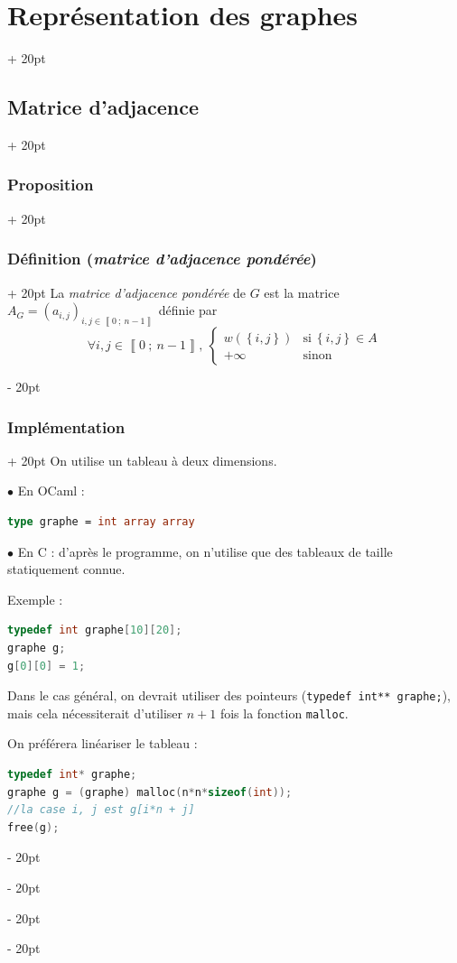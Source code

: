 \documentclass[a4paper, 12pt, twoside]{article}
\newcommand{\nset}[2]{\left\llbracket #1\ ;\ #2 \right\rrbracket}
\newcommand{\set}[1]{\left\{ #1 \right\}}
\newcommand{\ind}[1][20pt]{\advance\leftskip + #1}
\newcommand{\deind}[1][20pt]{\advance\leftskip - #1}
\newenvironment{indt}[2][20pt]{#2 \par \ind[#1]}{\par \deind} %
\begin{document}
\begin{indt}{\section{Représentation des graphes}}
\begin{indt}{\subsection{Matrice d'adjacence}}
\begin{indt}{\subsubsection{Proposition}}
\begin{indt}{\subsubsection{Définition (\textit{matrice d'adjacence pondérée})}}
                    La \textit{matrice d'adjacence pondérée} de $G$ est la matrice
                    $A_G = (a_{i,j})_{i,j \in \nset{0}{n - 1}}$ définie par
                    \[
                        \forall i, j \in \nset 0 {n - 1},\
                        \left\{\!\!
                        \begin{array}{ll}
                            w(\set{i, j})
                            &\text{si}\ \set{i, j} \in A
                            \\
                            +\infty
                            & \text{sinon}
                        \end{array}
                        \right.
                    \]
                \end{indt}

                \vspace{12pt}
                
                \begin{indt}{\subsubsection{Implémentation}}
                    On utilise un tableau à deux dimensions.

                    $\bullet$ En OCaml :
                    \begin{lstlisting}[language=Caml, xleftmargin=100pt]
type graphe = int array array\end{lstlisting}

                    $\bullet$ En C : d'après le programme, on n'utilise que des tableaux de taille statiquement connue.

                    Exemple :

                    \begin{lstlisting}[language=C, xleftmargin=100pt]
typedef int graphe[10][20];
graphe g;
g[0][0] = 1;\end{lstlisting}

                    Dans le cas général, on devrait utiliser des pointeurs (\texttt{typedef int** graphe;}), mais cela nécessiterait d'utiliser $n + 1$ fois la fonction \texttt{malloc}.

                    On préférera linéariser le tableau :

                    \begin{lstlisting}[language=C, xleftmargin=100pt]
typedef int* graphe;
graphe g = (graphe) malloc(n*n*sizeof(int));
//la case i, j est g[i*n + j]
free(g);\end{lstlisting}


\end{indt}
\end{indt}
\end{indt}
\end{indt}
\end{document}
